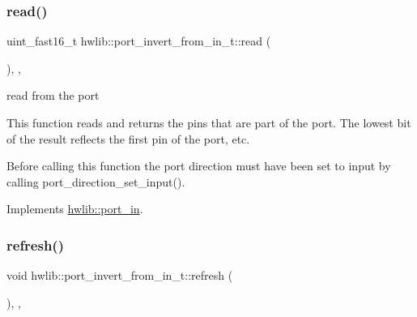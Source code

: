 \mbox{\label{classhwlib_1_1port__invert__from__in__t_a757144b4b465c6d81f222698ea217f47}} 
\subsubsection{\texorpdfstring{read()}{read()}}
{\footnotesize\ttfamily uint\+\_\+fast16\+\_\+t hwlib\+::port\+\_\+invert\+\_\+from\+\_\+in\+\_\+t\+::read (\begin{DoxyParamCaption}{ }\end{DoxyParamCaption})\hspace{0.3cm}{\ttfamily [inline]}, {\ttfamily [override]}, {\ttfamily [virtual]}}





read from the port

This function reads and returns the pins that are part of the port. The lowest bit of the result reflects the first pin of the port, etc.

Before calling this function the port direction must have been set to input by calling port\+\_\+direction\+\_\+set\+\_\+input(). 

Implements \hyperlink{classhwlib_1_1port__in_aa3aa277f9448c3ee493c56f05beb2ddb}{hwlib\+::port\+\_\+in}.

\mbox{\label{classhwlib_1_1port__invert__from__in__t_a7d1b6da3c97d9d3edbe0c10697f1ceca}} 
\subsubsection{\texorpdfstring{refresh()}{refresh()}}
{\footnotesize\ttfamily void hwlib\+::port\+\_\+invert\+\_\+from\+\_\+in\+\_\+t\+::refresh (\begin{DoxyParamCaption}{ }\end{DoxyParamCaption})\hspace{0.3cm}{\ttfamily [inline]}, {\ttfamily [override]}, {\ttfamily [virtual]}}





